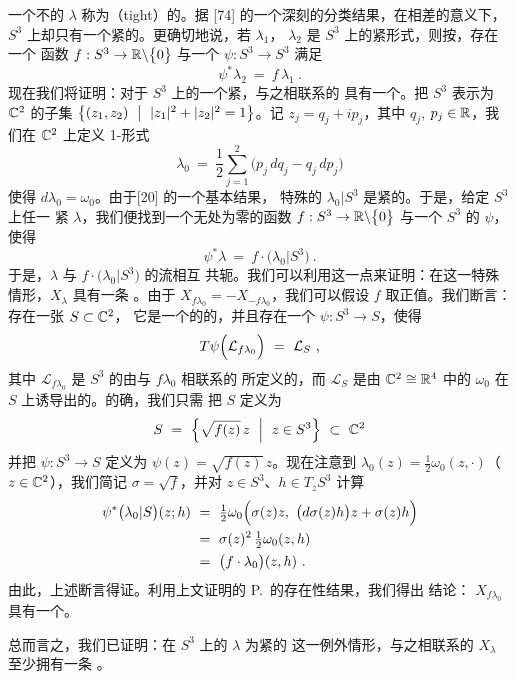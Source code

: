 一个不\trOvertwisted{}的\trContactForm{} $\lambda$ 称为\textbf{\trTight}（tight）的。据%
\trEliashberg{} [74] 的一个深刻的分类结果，在相差\trDiffeomorphism{}的意义下，%
$S^{3}$ 上却只有一个紧的\trContactStructure。更确切地说，若 $\lambda_{1}$，%
$\lambda_{2}$ 是 $S^{3}$ 上的紧形式，则按\trEliashberg，存在一个\trSmooth{}%
函数 $f:S^{3}\to\mathbb{R}\backslash\bigl\{0\bigr\}$ 与一个\trDiffeomorphism{}%
$\psi:S^{3}\to S^{3}$ 满足
\[
\psi^{*}\lambda_{2}\ =\ f\,\lambda_{1}\ .
\]
现在我们将证明：对于 $S^{3}$ 上的一个紧\trContactStructure，与之相联系的%
\trReeb\trVectorField{}具有一个\trPeriodicSolution。把 $S^{3}$ 表示为 $\mathbb{C}^{2}$%
的子集 $\bigl\{(z_{1},z_{2})\ \bigm|\ |z_{1}|^{2}+|z_{2}|^{2}=1\bigr\}$。记%
$z_{j}=q_{j}+ip_{j}$，其中 $q_{j}$, $p_{j}\in\mathbb{R}$，我们在 $\mathbb{C}^{2}$ 上定义%
1-形式
\[
\lambda_{0}\ =\ \frac{1}{2}\sum_{j=1}^{2}\bigl(p_{j}\,dq_{j}-q_{j}\,dp_{j}\bigr)
\]
使得 $d\lambda_{0}=\omega_{0}$。由于\trBennequin{}[20] 的一个基本结果，%
特殊的\trContactForm{} $\lambda_{0}|S^{3}$ 是紧的。于是，给定 $S^{3}$ 上任一%
紧\trContactForm{} $\lambda$，我们便找到一个无处为零的函数%
$f:S^{3}\to\mathbb{R}\backslash\bigl\{0\bigr\}$ 与一个 $S^{3}$ 的\trDiffeomorphism{}%
$\psi$，使得
\[
\psi^{*}\lambda\ =\ f\cdot\bigl(\lambda_{0}|S^{3}\bigr)\ .
\]
于是，$\lambda$ 与 $f\cdot\bigl(\lambda_{0}|S^{3}\bigr)$ 的\trReeb{}流相互%
共轭。我们可以利用这一点来证明：在这一特殊情形，$X_{\lambda}$ 具有一条%
\trPeriodicOrbit。由于 $X_{f\lambda_{0}}=-X_{-f\lambda_{0}}$，我们可以假设%
$f$ 取正值。我们断言：存在一张\trSmooth\trHypersurface{} $S\subset\mathbb{C}^{2}$，%
它是一个\trStarShaped{}的\trDomain{}的\trBoundary，并且存在一个%
\trDiffeomorphism{} $\psi:S^{3}\to S$，使得
\[
T\psi\Bigl(\mathcal{L}_{f\lambda_{0}}\Bigr)\ =\ \mathcal{L}_{S}\ ,
\]
其中 $\mathcal{L}_{f\lambda_{0}}$ 是 $S^{3}$ 的由与 $f\lambda_{0}$ 相联系的%
\trReeb\trVectorField{}所定义的\trLineBundle，而 $\mathcal{L}_{S}$ 是由%
$\mathbb{C}^{2}\cong\mathbb{R}^{4}$ 中的\trStandard\trSymplecticStructure{} $\omega_{0}$ 在%
\trHypersurface{} $S$ 上诱导出的\trCharacteristicLineBundle。的确，我们只需%
把\trHypersurface{} $S$ 定义为
\[
S\ =\ \Bigl\{\sqrt{f(z)}\,z\ \Bigm|\ z\in S^{3}\Bigr\}\ \subset\ \C^{2}
\]
并把\trDiffeomorphism{} $\psi:S^{3}\to S$ 定义为%
$\psi(z)=\sqrt{f(z)}\,z$。现在注意到 $\lambda_{0}(z)=\tfrac{1}{2}%
\omega_{0}(z,\cdot)$（$z\in\mathbb{C}^{2}$），我们简记 $\sigma=\sqrt{f}$，并对%
$z\in S^{3}$、$h\in T_{z}S^{3}$ 计算
\begin{align*}
\psi^{*}\bigl(\lambda_{0}|S\bigr)(z;h)\ &=\ \tfrac{1}{2}\omega_{0}\Bigl(\sigma(z)z,\ \bigl(d\sigma(z)h\bigr)z+\sigma(z)h\Bigr)\\
&=\ \sigma(z)^{2}\,\tfrac{1}{2}\omega_{0}(z,h)\\
&=\ \bigl(f\cdot\lambda_{0}\bigr)(z,h)\ .
\end{align*}
由此，上述断言得证。利用上文证明的 P.~\trRabinowitz{}的存在性结果，我们得出%
结论：\trReeb\trVectorField{} $X_{f\lambda_{0}}$ 具有一个\trPeriodicSolution。

总而言之，我们已证明：在 $S^{3}$ 上的\trContactStructure{} $\lambda$ 为紧的%
这一例外情形，与之相联系的\trReeb\trVectorField{} $X_{\lambda}$ 至少拥有一条%
\trClosed\trOrbit。
